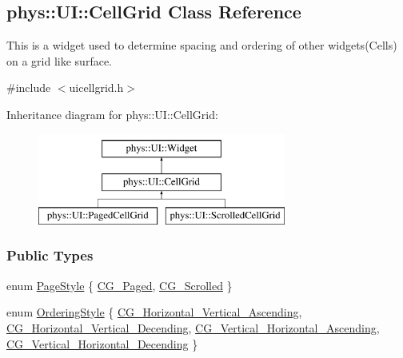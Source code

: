 \hypertarget{classphys_1_1UI_1_1CellGrid}{
\subsection{phys::UI::CellGrid Class Reference}
\label{d8/d59/classphys_1_1UI_1_1CellGrid}
}


This is a widget used to determine spacing and ordering of other widgets(Cells) on a grid like surface.  




{\ttfamily \#include $<$uicellgrid.h$>$}

Inheritance diagram for phys::UI::CellGrid:\begin{figure}[H]
\begin{center}
\leavevmode
\includegraphics[height=3.000000cm]{d8/d59/classphys_1_1UI_1_1CellGrid}
\end{center}
\end{figure}
\subsubsection*{Public Types}
\begin{DoxyCompactItemize}
\item 
enum \hyperlink{classphys_1_1UI_1_1CellGrid_a3644cef16e10c867c233105aae7b4e75}{PageStyle} \{ \hyperlink{classphys_1_1UI_1_1CellGrid_a3644cef16e10c867c233105aae7b4e75a5cc13206330cf9ed55fb443ff4600c77}{CG\_\-Paged}, 
\hyperlink{classphys_1_1UI_1_1CellGrid_a3644cef16e10c867c233105aae7b4e75add8259b571786b4e1976dcdb97a8e9c6}{CG\_\-Scrolled}
 \}
\item 
enum \hyperlink{classphys_1_1UI_1_1CellGrid_a4b77ef63082513fc9f845537d104496b}{OrderingStyle} \{ \hyperlink{classphys_1_1UI_1_1CellGrid_a4b77ef63082513fc9f845537d104496ba40efb4a2512c8f3129eaf967522c9b30}{CG\_\-Horizontal\_\-Vertical\_\-Ascending}, 
\hyperlink{classphys_1_1UI_1_1CellGrid_a4b77ef63082513fc9f845537d104496badecf0f97dbc2c5f4df2ac84b1c063de6}{CG\_\-Horizontal\_\-Vertical\_\-Decending}, 
\hyperlink{classphys_1_1UI_1_1CellGrid_a4b77ef63082513fc9f845537d104496ba6114116f4ee36620ca28d2ca052d6839}{CG\_\-Vertical\_\-Horizontal\_\-Ascending}, 
\hyperlink{classphys_1_1UI_1_1CellGrid_a4b77ef63082513fc9f845537d104496bab220567598ddaadfe133b9fef6f14b43}{CG\_\-Vertical\_\-Horizontal\_\-Decending}
 \}
\end{DoxyCompactItemize}
